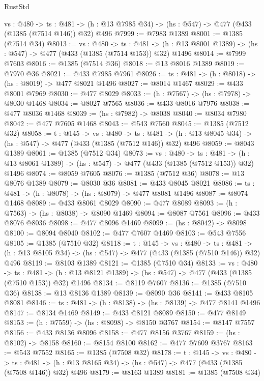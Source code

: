 \begin{lexlean}{RustStd}
\begin{coremodule}
  {vs : @480} ->
  {ts : @481} -> (h : @13 @7985 @34) -> (hs : @547) -> @477 (@433 (@1385 (@7514 @146)) @32) @496
@7999 := @7983 @1389
@8001 := @1385 (@7514 @34)
@8013 := {vs : @480} ->
  {ts : @481} -> (h : @13 @8001 @1389) -> (hs : @547) -> @477 (@433 (@1385 (@7514 @153)) @32) @1496
@8014 := @7999 @7603
@8016 := @1385 (@7514 @36)
@8018 := @13 @8016 @1389
@8019 := @7970 @36
@8021 := @433 @7985 @7961
@8026 := {ts : @481} -> (h : @8018) -> (hs : @8019) -> @477 @8021 @1496
@8027 := @8014 @1467
@8029 := @433 @8001 @7969
@8030 := @477 @8029
@8033 := (h : @7567) -> (hs : @7978) -> @8030 @1468
@8034 := @8027 @7565
@8036 := @433 @8016 @7976
@8038 := @477 @8036 @1468
@8039 := (hs : @7982) -> @8038
@8040 := @8034 @7980
@8042 := @477 @7605 @1468
@8043 := @543 @7560
@8045 := @1385 (@7512 @32)
@8058 := {t : @145} ->
  {vs : @480} ->
  {ts : @481} -> (h : @13 @8045 @34) -> (hs : @547) -> @477 (@433 (@1385 (@7512 @146)) @32) @496
@8059 := @8043 @1389
@8061 := @1385 (@7512 @34)
@8073 := {vs : @480} ->
  {ts : @481} -> (h : @13 @8061 @1389) -> (hs : @547) -> @477 (@433 (@1385 (@7512 @153)) @32) @1496
@8074 := @8059 @7605
@8076 := @1385 (@7512 @36)
@8078 := @13 @8076 @1389
@8079 := @8030 @36
@8081 := @433 @8045 @8021
@8086 := {ts : @481} -> (h : @8078) -> (hs : @8079) -> @477 @8081 @1496
@8087 := @8074 @1468
@8089 := @433 @8061 @8029
@8090 := @477 @8089
@8093 := (h : @7563) -> (hs : @8038) -> @8090 @1469
@8094 := @8087 @7561
@8096 := @433 @8076 @8036
@8098 := @477 @8096 @1469
@8099 := (hs : @8042) -> @8098
@8100 := @8094 @8040
@8102 := @477 @7607 @1469
@8103 := @543 @7556
@8105 := @1385 (@7510 @32)
@8118 := {t : @145} ->
  {vs : @480} ->
  {ts : @481} -> (h : @13 @8105 @34) -> (hs : @547) -> @477 (@433 (@1385 (@7510 @146)) @32) @496
@8119 := @8103 @1389
@8121 := @1385 (@7510 @34)
@8133 := {vs : @480} ->
  {ts : @481} -> (h : @13 @8121 @1389) -> (hs : @547) -> @477 (@433 (@1385 (@7510 @153)) @32) @1496
@8134 := @8119 @7607
@8136 := @1385 (@7510 @36)
@8138 := @13 @8136 @1389
@8139 := @8090 @36
@8141 := @433 @8105 @8081
@8146 := {ts : @481} -> (h : @8138) -> (hs : @8139) -> @477 @8141 @1496
@8147 := @8134 @1469
@8149 := @433 @8121 @8089
@8150 := @477 @8149
@8153 := (h : @7559) -> (hs : @8098) -> @8150 @3767
@8154 := @8147 @7557
@8156 := @433 @8136 @8096
@8158 := @477 @8156 @3767
@8159 := (hs : @8102) -> @8158
@8160 := @8154 @8100
@8162 := @477 @7609 @3767
@8163 := @543 @7552
@8165 := @1385 (@7508 @32)
@8178 := {t : @145} ->
  {vs : @480} ->
  {ts : @481} -> (h : @13 @8165 @34) -> (hs : @547) -> @477 (@433 (@1385 (@7508 @146)) @32) @496
@8179 := @8163 @1389
@8181 := @1385 (@7508 @34)

\end{coremodule}
\end{lexlean}
